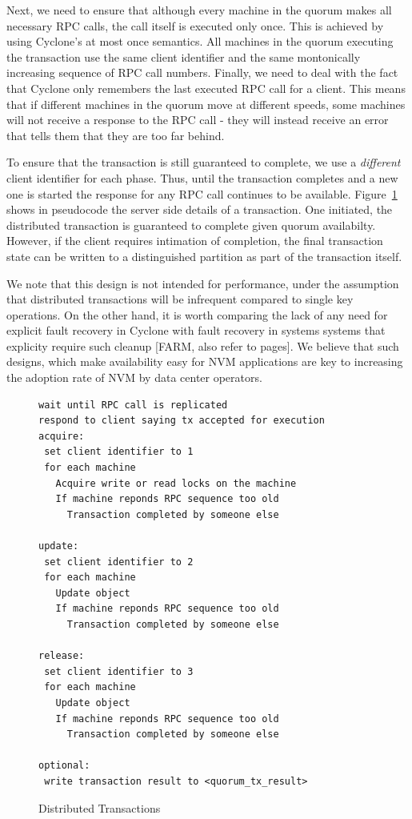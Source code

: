 \documentclass[letterpaper,twocolumn,10pt]{article}
\begin{document}
Next, we need to ensure that although every machine in the quorum makes all
necessary RPC calls, the call itself is executed only once. This is achieved by
using Cyclone's at most once semantics. All machines in the quorum executing the
transaction use the same client identifier and the same montonically increasing
sequence of RPC call numbers. Finally, we need to deal with the fact that
Cyclone only remembers the last executed RPC call for a client. This means that
if different machines in the quorum move at different speeds, some machines will
not receive a response to the RPC call - they will instead receive an error that
tells them that they are too far behind.

To ensure that the transaction is still guaranteed to complete, we use a
\emph{different} client identifier for each phase. Thus, until the transaction
completes and a new one is started the response for any RPC call continues to be
available. Figure~\ref{fig:dist_tx} shows in pseudocode the server side details
of a transaction. One initiated, the distributed transaction is guaranteed to
complete given quorum availabilty. However, if the client requires intimation of
completion, the final transaction state can be written to a distinguished
partition as part of the transaction itself.

We note that this design is not intended for performance, under the assumption
that distributed transactions will be infrequent compared to single key
operations.  On the other hand, it is worth comparing the lack of any need for
explicit fault recovery in Cyclone with fault recovery in systems systems that
explicity require such cleanup [FARM, also refer to pages].  We believe that
such designs, which make availability easy for NVM applications are key to
increasing the adoption rate of NVM by data center operators.

\begin{figure}
{ \scriptsize
\begin{verbatim}
wait until RPC call is replicated
respond to client saying tx accepted for execution
acquire:
 set client identifier to 1
 for each machine
   Acquire write or read locks on the machine
   If machine reponds RPC sequence too old
     Transaction completed by someone else

update:
 set client identifier to 2
 for each machine
   Update object
   If machine reponds RPC sequence too old
     Transaction completed by someone else
 
release:
 set client identifier to 3
 for each machine
   Update object
   If machine reponds RPC sequence too old
     Transaction completed by someone else

optional:
 write transaction result to <quorum_tx_result>
\end{verbatim}
}
\caption{Distributed Transactions}
\label{fig:dist_tx}
\end{figure}
\end{document}
